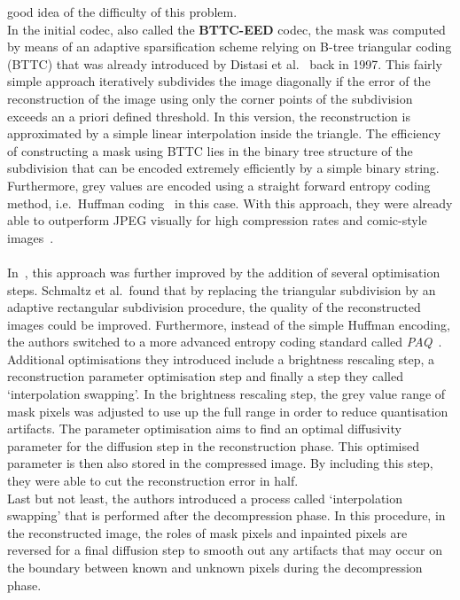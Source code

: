 good idea of the difficulty of this problem.\\
In the initial codec, also called the \textbf{BTTC-EED} codec, the mask was
computed by means of an adaptive sparsification scheme relying on B-tree triangular coding (BTTC)
that was already introduced by Distasi et al.~\cite{distasi97} back in 1997. This fairly simple
approach iteratively subdivides the image diagonally if the error of the reconstruction of the image using only
the corner points of the subdivision exceeds an a priori defined threshold. In this version, the
reconstruction is approximated by a simple linear interpolation inside the triangle. The efficiency
of constructing a mask using BTTC lies in the binary tree structure of the subdivision that can be encoded extremely
efficiently by a simple binary string. Furthermore, grey values are encoded using a straight
forward entropy coding method, i.e.\ Huffman coding~\cite{huffman} in this case.
With this approach, they were already able to outperform JPEG visually for high
compression rates and comic-style images~\cite{galic05}.\\
\\
In~\cite{schmaltz09}, this approach was further improved by the addition of several optimisation
steps. Schmaltz et al.\ found that by replacing the triangular subdivision by an adaptive rectangular
subdivision procedure, the quality of the reconstructed images could be improved. Furthermore,
instead of the simple Huffman encoding, the authors switched to a more advanced entropy coding standard
called \textit{PAQ}~\cite{paq}. \\
Additional optimisations they introduced include a brightness rescaling
step, a reconstruction parameter optimisation step and finally a step they called `interpolation
swapping'.
In the brightness rescaling step, the grey value range of mask pixels was adjusted to use up the 
full range in order to reduce quantisation artifacts.
The parameter optimisation aims to find an optimal diffusivity parameter for the diffusion step in
the reconstruction phase. This optimised parameter is then also stored in the compressed image.
By including this step, they were able to cut the reconstruction error in half.\\
Last but not least, the authors introduced a process called `interpolation swapping' that is performed
after the decompression phase. In this procedure, in the reconstructed image, the roles of mask
pixels and inpainted pixels are reversed for a final diffusion step to smooth out any artifacts
that may occur on the boundary between known and unknown pixels during the decompression phase.\\
